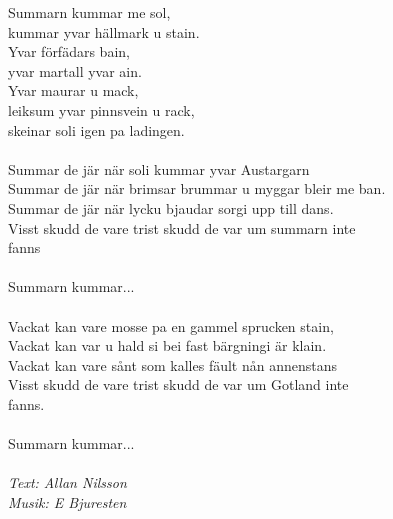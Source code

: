 \vspace{10pt}
Summarn kummar me sol,\\
kummar yvar hällmark u stain.\\
Yvar förfädars bain,\\
yvar martall yvar ain.\\
Yvar maurar u mack,\\
leiksum yvar pinnsvein u rack,\\
skeinar soli igen pa ladingen.\\
\\
Summar de jär när soli kummar yvar Austargarn\\
Summar de jär när brimsar brummar u myggar bleir me ban.\\
Summar de jär när lycku bjaudar sorgi upp till dans.\\
Visst skudd de vare trist skudd de var um summarn inte \\
fanns\\
\\
Summarn kummar...\\
\\
Vackat kan vare mosse pa en gammel sprucken stain,\\
Vackat kan var u hald si bei fast bärgningi är klain.\\
Vackat kan vare sånt som kalles fäult nån annenstans\\
Visst skudd de vare trist skudd de var um Gotland inte \\
fanns.\\
\\
Summarn kummar...\\
\\
{\footnotesize\textit{Text: Allan Nilsson\\ Musik: E Bjuresten}}
